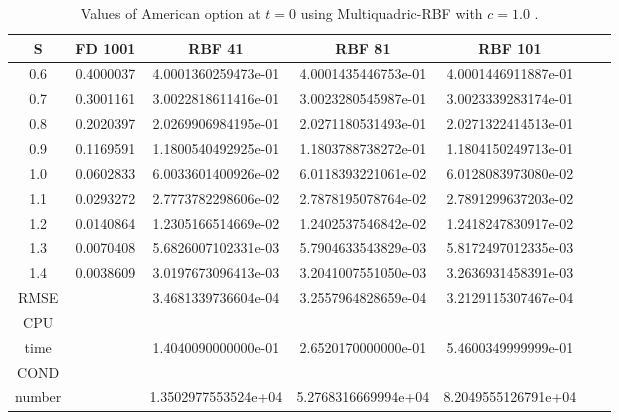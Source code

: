 \documentclass[12pt]{article}
\numberwithin{equation}{subsection} %
\begin{document}
\newpage
\begin{table}[h]
\centering
\caption{Values of American option at $t=0$ using
Multiquadric-RBF with $c=1.0$ .}
 \vspace{5mm}
\begin{tabular}{|c|c|c|c|c|c|c|}
  \hline
  S & FD 1001  & RBF 41 & RBF 81 & RBF 101 \\
  \hline
  0.6 & 0.4000037 &4.0001360259473e-01  &   4.0001435446753e-01&  4.0001446911887e-01 \\
  0.7 & 0.3001161  & 3.0022818611416e-01 &   3.0023280545987e-01&3.0023339283174e-01 \\
  0.8 & 0.2020397  & 2.0269906984195e-01 & 2.0271180531493e-01 & 2.0271322414513e-01 \\
  0.9 & 0.1169591  & 1.1800540492925e-01  &  1.1803788738272e-01 &1.1804150249713e-01 \\
  1.0 & 0.0602833  & 6.0033601400926e-02 &  6.0118393221061e-02& 6.0128083973080e-02 \\
  1.1 & 0.0293272  & 2.7773782298606e-02  & 2.7878195078764e-02 &2.7891299637203e-02 \\
  1.2 & 0.0140864  & 1.2305166514669e-02 & 1.2402537546842e-02 & 1.2418247830917e-02 \\
  1.3 & 0.0070408  &  5.6826007102331e-03 &   5.7904633543829e-03& 5.8172497012335e-03 \\
  1.4 & 0.0038609  & 3.0197673096413e-03 & 3.2041007551050e-03 & 3.2636931458391e-03  \\
  \hline
  RMSE &   & 3.4681339736604e-04 &  3.2557964828659e-04 &  3.2129115307467e-04 \\
  \hline
  CPU &   &  &  &  \\
  time  &   & 1.4040090000000e-01  &   2.6520170000000e-01&  5.4600349999999e-01\\
  \hline
   COND &   &  &  &  \\
  number  &   & 1.3502977553524e+04  &  5.2768316669994e+04&  8.2049555126791e+04 \\
  \hline
\end{tabular}

\end{table}
\end{document}
